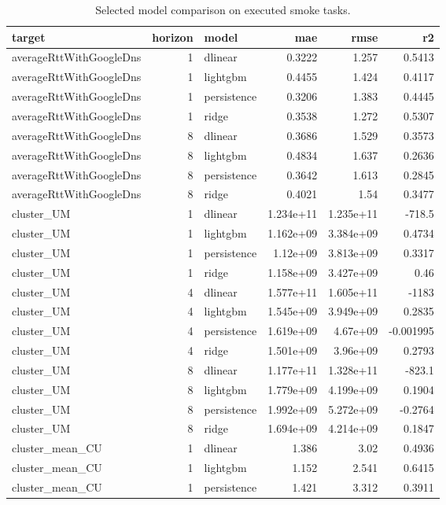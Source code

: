 \begin{table}
\caption{Selected model comparison on executed smoke tasks.}
\label{tab:ablation}
\begin{tabular}{lrlrrr}
\toprule
target & horizon & model & mae & rmse & r2 \\
\midrule
averageRttWithGoogleDns & 1 & dlinear & 0.3222 & 1.257 & 0.5413 \\
averageRttWithGoogleDns & 1 & lightgbm & 0.4455 & 1.424 & 0.4117 \\
averageRttWithGoogleDns & 1 & persistence & 0.3206 & 1.383 & 0.4445 \\
averageRttWithGoogleDns & 1 & ridge & 0.3538 & 1.272 & 0.5307 \\
averageRttWithGoogleDns & 8 & dlinear & 0.3686 & 1.529 & 0.3573 \\
averageRttWithGoogleDns & 8 & lightgbm & 0.4834 & 1.637 & 0.2636 \\
averageRttWithGoogleDns & 8 & persistence & 0.3642 & 1.613 & 0.2845 \\
averageRttWithGoogleDns & 8 & ridge & 0.4021 & 1.54 & 0.3477 \\
cluster_UM & 1 & dlinear & 1.234e+11 & 1.235e+11 & -718.5 \\
cluster_UM & 1 & lightgbm & 1.162e+09 & 3.384e+09 & 0.4734 \\
cluster_UM & 1 & persistence & 1.12e+09 & 3.813e+09 & 0.3317 \\
cluster_UM & 1 & ridge & 1.158e+09 & 3.427e+09 & 0.46 \\
cluster_UM & 4 & dlinear & 1.577e+11 & 1.605e+11 & -1183 \\
cluster_UM & 4 & lightgbm & 1.545e+09 & 3.949e+09 & 0.2835 \\
cluster_UM & 4 & persistence & 1.619e+09 & 4.67e+09 & -0.001995 \\
cluster_UM & 4 & ridge & 1.501e+09 & 3.96e+09 & 0.2793 \\
cluster_UM & 8 & dlinear & 1.177e+11 & 1.328e+11 & -823.1 \\
cluster_UM & 8 & lightgbm & 1.779e+09 & 4.199e+09 & 0.1904 \\
cluster_UM & 8 & persistence & 1.992e+09 & 5.272e+09 & -0.2764 \\
cluster_UM & 8 & ridge & 1.694e+09 & 4.214e+09 & 0.1847 \\
cluster_mean_CU & 1 & dlinear & 1.386 & 3.02 & 0.4936 \\
cluster_mean_CU & 1 & lightgbm & 1.152 & 2.541 & 0.6415 \\
cluster_mean_CU & 1 & persistence & 1.421 & 3.312 & 0.3911 \\

\end{tabular}
\end{table}
